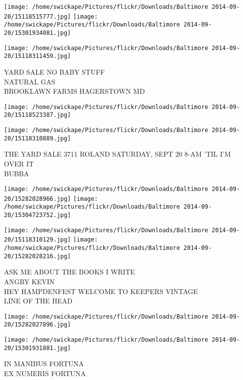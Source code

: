 \documentclass[10pt,letterpaper]{article}
\begin{document}
\texttt{[image: /home/swickape/Pictures/flickr/Downloads/Baltimore 2014-09-20/15118515777.jpg]}
\texttt{[image: /home/swickape/Pictures/flickr/Downloads/Baltimore 2014-09-20/15301934081.jpg]}

\vspace{0.25in}
\texttt{[image: /home/swickape/Pictures/flickr/Downloads/Baltimore 2014-09-20/15118311459.jpg]}

YARD SALE NO BABY STUFF\\
NATURAL GAS\\
BROOKLAWN FARMS HAGERSTOWN MD\\
\pagebreak

\texttt{[image: /home/swickape/Pictures/flickr/Downloads/Baltimore 2014-09-20/15118523387.jpg]}

\vspace{0.25in}
\texttt{[image: /home/swickape/Pictures/flickr/Downloads/Baltimore 2014-09-20/15118310889.jpg]}

THE YARD SALE 3711 ROLAND SATURDAY, SEPT 20 8{-}AM 'TIL I'M OVER IT\\
BUBBA\\
\pagebreak

\texttt{[image: /home/swickape/Pictures/flickr/Downloads/Baltimore 2014-09-20/15282028966.jpg]}
\texttt{[image: /home/swickape/Pictures/flickr/Downloads/Baltimore 2014-09-20/15304723752.jpg]}

\texttt{[image: /home/swickape/Pictures/flickr/Downloads/Baltimore 2014-09-20/15118310129.jpg]}
\texttt{[image: /home/swickape/Pictures/flickr/Downloads/Baltimore 2014-09-20/15282028216.jpg]}

ASK ME ABOUT THE BOOKS I WRITE\\
ANGRY KEVIN\\
HEY HAMPDENFEST WELCOME TO KEEPERS VINTAGE\\
LINE OF THE HEAD\\
\pagebreak

\texttt{[image: /home/swickape/Pictures/flickr/Downloads/Baltimore 2014-09-20/15282027896.jpg]}

\vspace{0.25in}
\texttt{[image: /home/swickape/Pictures/flickr/Downloads/Baltimore 2014-09-20/15301931881.jpg]}

IN MANIBUS FORTUNA\\
EX NUMERIS FORTUNA\\
\pagebreak
\end{document}
